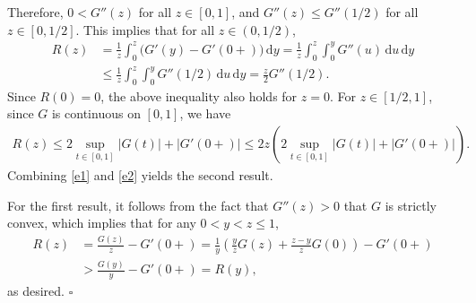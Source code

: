 \documentclass[11pt]{article}
\numberwithin{equation}{section}
\def\qed{\hfill$\square$\smallskip}
\begin{document}
Therefore, $0 < G''(z)$ for all $z \in [0,1]$, and $G''(z) \leq G''(1/2)$ for all $z \in [0, 1/2]$. This implies that for all $z \in (0, 1/2)$,
\begin{align}\label{e1}
	R(z) 
	&= \frac{1}{z} \int_0^z \bigl(G'(y) - G'(0+)\bigr) \, \mathrm{d}y 
	= \frac{1}{z} \int_0^z \int_0^y G''(u) \, \mathrm{d}u \, \mathrm{d}y \nonumber\\
	&\leq \frac{1}{z} \int_0^z \int_0^y G''(1/2) \, \mathrm{d}u \, \mathrm{d}y 
	= \frac{z}{2} G''(1/2).
\end{align}
Since $R(0) = 0$, the above inequality also holds for $z = 0$. For $z \in [1/2, 1]$, since $G$ is continuous on $[0,1]$, we have
\begin{align}\label{e2}
	R(z) \leq 2 \sup_{t \in [0,1]} |G(t)| + |G'(0+)| 
	\leq 2z \left( 2 \sup_{t \in [0,1]} |G(t)| + |G'(0+)| \right).
\end{align}
Combining \eqref{e1} and \eqref{e2} yields the second result.

For the first result, it follows from the fact that $G''(z) > 0$ that $G$ is strictly convex, which implies that for any $0 < y < z \leq 1$,
\begin{align*}
	R(z) 
	&= \frac{G(z)}{z} - G'(0+) 
	= \frac{1}{y} \left( \frac{y}{z} G(z) + \frac{z-y}{z} G(0) \right) - G'(0+) \nonumber\\
	&> \frac{G(y)}{y} - G'(0+) = R(y),
\end{align*}
as desired.
\qed 
\end{document}
